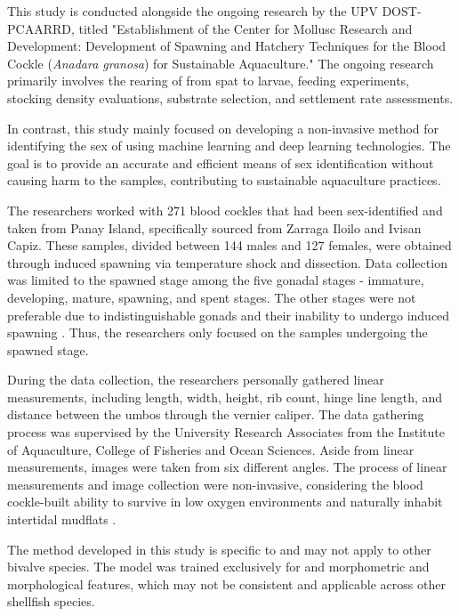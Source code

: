 This study is conducted alongside the ongoing research by the UPV DOST-PCAARRD, titled "Establishment of the Center for Mollusc Research and Development: Development of Spawning and Hatchery Techniques for the Blood Cockle (\textit{Anadara granosa}) for Sustainable Aquaculture." The ongoing research primarily involves the rearing of \Tegillarcagranosa from spat to larvae, feeding experiments, stocking density evaluations, substrate selection, and settlement rate assessments.

In contrast, this study mainly focused on developing a non-invasive method for identifying the sex of \Tgranosa using machine learning and deep learning technologies. The goal is to provide an accurate and efficient means of sex identification without causing harm to the samples, contributing to sustainable aquaculture practices.

The researchers worked with 271  blood cockles that had been sex-identified and taken from Panay Island, specifically sourced from Zarraga Iloilo and Ivisan Capiz. These samples, divided between 144 males and 127 females, were obtained through induced spawning via temperature shock and dissection. Data collection was limited to the spawned stage among the five gonadal stages  - immature, developing, mature, spawning, and spent stages. The other stages were not preferable due to indistinguishable gonads and their inability to undergo induced spawning \cite{may2021}.  Thus, the researchers only focused on the samples undergoing the spawned stage. 

During the data collection,  the researchers personally gathered linear measurements, including length, width, height, rib count, hinge line length, and distance between the umbos through the vernier caliper. The data gathering process was supervised by the University Research Associates from the Institute of Aquaculture, College of Fisheries and Ocean Sciences. Aside from linear measurements, images were taken from six different angles. The process of linear measurements and image collection were non-invasive, considering the blood cockle-built ability to survive in low oxygen environments and naturally inhabit intertidal mudflats \cite{zhan2022}.

The method developed in this study is specific to \Tgranosa and may not apply to other bivalve species. The model was trained exclusively for \Tgranosa and morphometric and morphological features, which may not be consistent and applicable across other shellfish species. 

